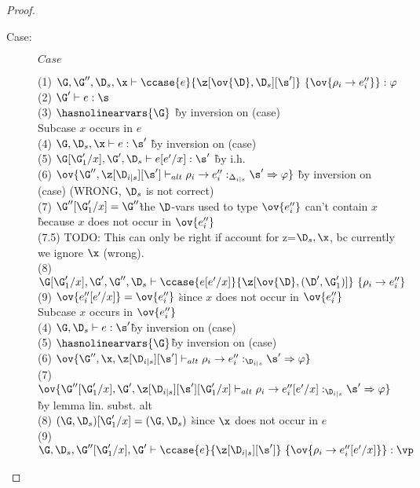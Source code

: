 \begin{proof}
\begin{description}
\item[Case:] $Case$
\begin{tabbing}
    (1) $\G, \G'', \D_s, \x \vdash \ccase{e}{\z[\ov{\D},\D_s][\s']}~\{\ov{\rho_i
    \to e''_i}\} : \varphi$\\
    (2) $\G' \vdash e : \s$\\
    (3) $\hasnolinearvars{\G}$ \` by inversion on (case)\\
    Subcase $x$ occurs in $e$\\
    (4) $\G, \D_s, \x \vdash e : \s'$ \` by inversion on (case)\\
    (5) $\G[\G'_1/x],\G',\D_s \vdash e[e'/x] : \s'$ \` by i.h.\\
    (6) $\ov{\G'',\z[\D_{i|s}][\s'] \vdash_{alt} \rho_i \to e''_i
    :_{\Delta_{i|s}} \s' \Rightarrow \varphi}$ \` by inversion on (case) (WRONG, $\D_s$ is not correct)\\
    (7) $\G''[\G'_1/x]=\G''$\` the $\D$-vars used to type $\ov{e''_i}$ can't contain $x$\\
                            \` because $x$ does not occur in $\ov{e''_i}$\\
    (7.5) TODO: This can only be right if account for z=$\D_s,\x$, bc currently we ignore $\x$ (wrong).\\
    (8) $\G[\G'_1/x],\G',\G'',\D_s \vdash \ccase{e[e'/x]}{\z[\ov{\D},(\D',\G'_1)]}~\{\rho_i \to e''_i\}$\\
    (9) $\ov{e''_i[e'/x]} = \ov{e''_i}$ \` since $x$ does not occur in $\ov{e''_i}$\\
    Subcase $x$ occurs in $\ov{e''_i}$\\
    (4) $\G,\D_s \vdash e : \s'$\` by inversion on (case)\\
    (5) $\hasnolinearvars{\G}$\` by inversion on (case)\\
    (6) $\ov{\G'',\x,\z[\D_{i|s}][\s'] \vdash_{alt} \rho_i \to e''_i :_{\D_{i|s}} \s' \Rightarrow \varphi}$\\
    (7) $\ov{\G''[\G'_1/x],\G',\z[\D_{i|s}][\s'][\G'_1/x] \vdash_{alt} \rho_i \to e''_i[e'/x] :_{\D_{i|s}} \s' \Rightarrow \varphi}$\` by lemma lin. subst. alt\\
    (8) $(\G,\D_s)[\G'_1/x] = (\G,\D_s)$ \` since $\x$ does not occur in $e$\\
    (9) $\G,\D_s,\G''[\G'_1/x],\G' \vdash \ccase{e}{\z[\D_{i|s}][\s']}~\{\ov{\rho_i \to e''_i[e'/x]}\} : \vp$\\
\end{tabbing}
\end{description}
\end{proof}

